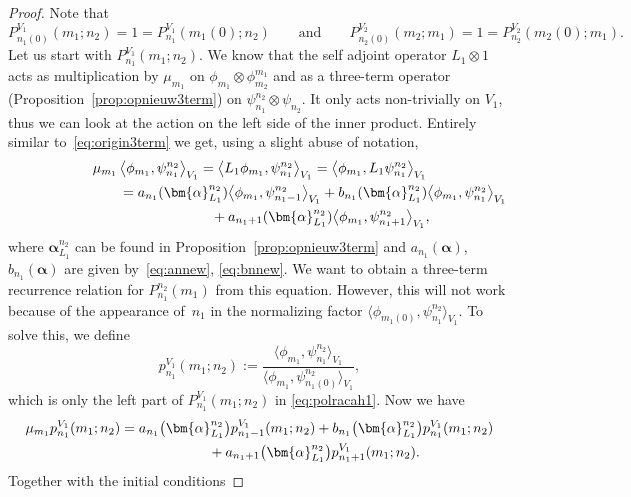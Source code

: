 \documentclass[pdftex]{sigma}
\numberwithin{equation}{section}
\newcommand{\inprod}[2]{\left\langle #1, #2 \right\rangle}
\begin{document}
\begin{proof}
	Note that
	\[
	P_{n_1(0)}^{V_1}(m_1;n_2)=1=P_{n_1}^{V_1}(m_1(0);n_2) \qquad \text{and}\qquad P_{n_2(0)}^{V_2}(m_2;m_1)=1=P_{n_2}^{V_2}(m_2(0);m_1).
	\]
	Let us start with $P_{n_1}^{V_1}(m_1;n_2)$. We know that the self adjoint operator $L_1\otimes 1$ acts as multiplication by $\mu_{m_1}$ on $\phi_{m_1}\otimes \phi_{m_2}^{m_1}$ and as a three-term operator (Proposition~\ref{prop:opnieuw3term}) on $\psi_{n_1}^{n_2}\otimes \psi_{n_2}$. It only acts non-trivially on $V_1$, thus we can look at the action on the left side of the inner product. Entirely similar to~\eqref{eq:origin3term} we get, using a slight abuse of notation,
	\begin{gather*}
		\mu_{m_1} \inprod{\phi_{m_1}}{\psi_{n_1}^{n_2}}_{V_1}= \big\langle L_1\phi_{m_1},\psi_{n_1}^{n_2}\big\rangle _{V_1}
		= \big\langle \phi_{m_1},L_1\psi_{n_1}^{n_2}\big\rangle _{V_1} \\
\hphantom{\mu_{m_1} \inprod{\phi_{m_1}}{\psi_{n_1}^{n_2}}_{V_1}}{}
= a_{n_1}(\bm{\alpha}_{L_1}^{n_2}) \big\langle \phi_{m_1},\psi_{n_1-1}^{n_2}\big\rangle _{V_1}+b_{n_1}(\bm{\alpha}_{L_1}^{n_2})\big\langle \phi_{m_1},\psi_{n_1}^{n_2}\big\rangle _{V_1}\\
\hphantom{\mu_{m_1} \inprod{\phi_{m_1}}{\psi_{n_1}^{n_2}}_{V_1}=}{}+a_{n_1+1}(\bm{\alpha}_{L_1}^{n_2})\big\langle \phi_{m_1},\psi_{n_1+1}^{n_2}\big\rangle _{V_1},
	\end{gather*}
	where $\bm{\alpha}_{L_1}^{n_2}$ can be found in Proposition~\ref{prop:opnieuw3term} and $a_{n_1}(\bm{\alpha})$, $b_{n_1}(\bm{\alpha})$ are given by~\eqref{eq:annew}, \eqref{eq:bnnew}. We want to obtain a three-term recurrence relation for $P_{n_1}^{n_2}(m_1)$ from this equation. However, this will not work because of the appearance of~$n_1$ in the normalizing factor $\big\langle \phi_{m_1(0)},\psi_{n_1}^{n_2}\big\rangle _{V_1}$. To solve this, we define
	\[
	p_{n_1}^{V_1}(m_1;n_2):=\frac{\big\langle \phi_{m_1},\psi_{n_1}^{n_2}\big\rangle _{V_1}}{\big\langle \phi_{m_1},\psi_{n_1(0)}^{n_2}\big\rangle _{V_1}},
	\]
	which is only the left part of $P_{n_1}^{V_1}(m_1;n_2)$ in \eqref{eq:polracah1}. Now we have
	\begin{gather*}
		\mu_{m_1}p_{n_1}^{V_1}(m_1;n_2)= a_{n_1}\big(\bm{\alpha}_{L_1}^{n_2}\big)p_{n_1-1}^{V_1}(m_1;n_2) + b_{n_1}\big(\bm{\alpha}_{L_1}^{n_2}\big)p_{n_1}^{V_1}(m_1;n_2)\\
\hphantom{\mu_{m_1}p_{n_1}^{V_1}(m_1;n_2)=}{}
+ a_{n_1+1}\big(\bm{\alpha}_{L_1}^{n_2}\big)p_{n_1+1}^{V_1}(m_1;n_2).
	\end{gather*}
	Together with the initial conditions

\end{proof}
\end{document}
